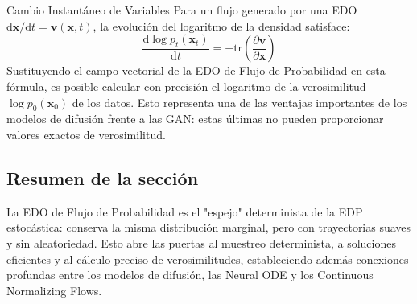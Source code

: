 \begin{importantbox}{Cambio Instantáneo de Variables}
Para un flujo generado por una EDO $\mathrm{d}\mathbf{x}/\mathrm{d}t = \mathbf{v}(\mathbf{x}, t)$, la evolución del logaritmo de la densidad satisface:
$$
\frac{\mathrm{d}\log p_t(\mathbf{x}_t)}{\mathrm{d}t} = -\mathrm{tr}\left(\frac{\partial \mathbf{v}}{\partial \mathbf{x}}\right)
$$
Sustituyendo el campo vectorial de la EDO de Flujo de Probabilidad en esta fórmula, es posible calcular con precisión el logaritmo de la verosimilitud $\log p_0(\mathbf{x}_0)$ de los datos. Esto representa una de las ventajas importantes de los modelos de difusión frente a las GAN: estas últimas no pueden proporcionar valores exactos de verosimilitud.
\end{importantbox}

\subsection{Resumen de la sección}

La EDO de Flujo de Probabilidad es el "espejo" determinista de la EDP estocástica: conserva la misma distribución marginal, pero con trayectorias suaves y sin aleatoriedad. Esto abre las puertas al muestreo determinista, a soluciones eficientes y al cálculo preciso de verosimilitudes, estableciendo además conexiones profundas entre los modelos de difusión, las Neural ODE y los Continuous Normalizing Flows.
